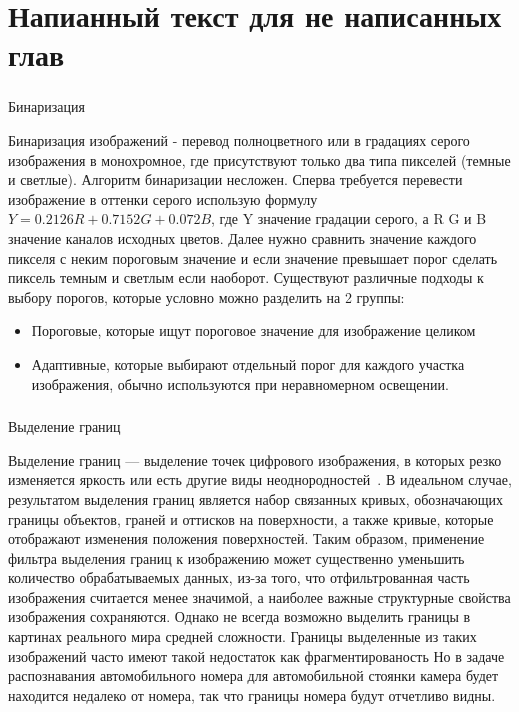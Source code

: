 \section{Напианный текст для не написанных глав}
\label{sec:temp}

\subsubsection{}
\label{sub:temp:image_processing:binary}
Бинаризация

Бинаризация изображений - перевод полноцветного или в градациях серого изображения в монохромное, где присутствуют только два типа пикселей (темные и светлые).\cite{binary_image}
Алгоритм бинаризации несложен. Сперва требуется перевести изображение в оттенки серого использую формулу $ Y = 0.2126R + 0.7152G + 0.072B $, где Y значение градации серого, а R G и B значение каналов исходных цветов. Далее нужно сравнить значение каждого пикселя с неким пороговым значение и если значение превышает порог сделать пиксель темным и светлым если наоборот. 
Существуют различные подходы к выбору порогов, которые условно можно разделить на 2 группы:
\begin{itemize}
  \item Пороговые, которые ищут пороговое значение для изображение целиком
  \item Адаптивные, которые выбирают отдельный порог для каждого участка изображения, обычно используются при неравномерном освещении.
\end{itemize}

\subsubsection{}
\label{sub:temp:image_processing:edge_detection}
Выделение границ

Выделение границ — выделение точек цифрового изображения, в которых резко изменяется яркость или есть другие виды неоднородностей~\cite{edge_detection}.
В идеальном случае, результатом выделения границ является набор связанных кривых, обозначающих границы объектов, граней и оттисков на поверхности, а также кривые, которые отображают изменения положения поверхностей. Таким образом, применение фильтра выделения границ к изображению может существенно уменьшить количество обрабатываемых данных, из-за того, что отфильтрованная часть изображения считается менее значимой, а наиболее важные структурные свойства изображения сохраняются. Однако не всегда возможно выделить границы в картинах реального мира средней сложности. Границы выделенные из таких изображений часто имеют такой недостаток как фрагментированость Но в задаче распознавания автомобильного номера для автомобильной стоянки камера будет находится недалеко от номера, так что границы номера будут отчетливо видны.

